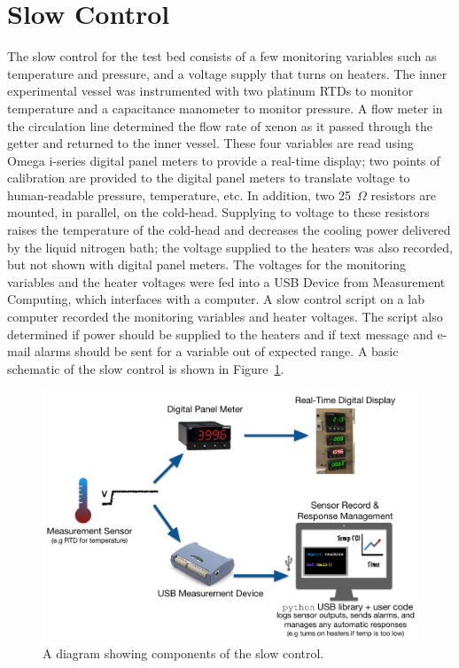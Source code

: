 \section{Slow Control}
The slow control for the test bed consists of a few monitoring variables such as temperature and pressure, and a voltage supply that turns on heaters. The inner experimental vessel was instrumented with two platinum RTDs to monitor temperature and a capacitance manometer to monitor pressure. A flow meter in the circulation line determined the flow rate of xenon as it passed through the getter and returned to the inner vessel. These four variables are read using Omega i-series digital panel meters to provide a real-time display; two points of calibration are provided to the digital panel meters to translate voltage to human-readable pressure, temperature, etc. In addition, two 25~$\Omega$ resistors are mounted, in parallel, on the cold-head. Supplying to voltage to these resistors raises the temperature of the cold-head and decreases the cooling power delivered by the liquid nitrogen bath; the voltage supplied to the heaters was also recorded, but not shown with digital panel meters. The voltages for the monitoring variables and the heater voltages were fed into a USB Device from Measurement Computing, which interfaces with a computer. A slow control script on a lab computer recorded the monitoring variables and heater voltages. The script also determined if power should be supplied to the heaters and if text message and e-mail alarms should be sent for a variable out of expected range. A basic schematic of the slow control is shown in Figure~\ref{fig:sc}.

\begin{figure}[htbp]
\begin{center}
\includegraphics[width=\textwidth]{figures/testbed/slow_control.png}
\caption{A diagram showing components of the slow control.}
\label{fig:sc}
\end{center}
\end{figure}

